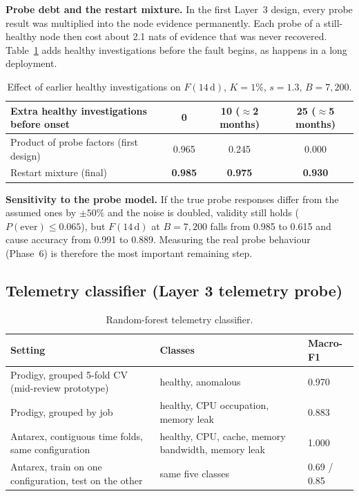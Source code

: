 \documentclass[10pt,a4paper]{article}
\begin{document}
\textbf{Probe debt and the restart mixture.} In the first Layer~3 design, every probe result was multiplied into the node evidence permanently. Each probe of a still-healthy node then cost about 2.1 nats of evidence that was never recovered. Table~\ref{tab:debt} adds healthy investigations before the fault begins, as happens in a long deployment.

\begin{table}[H]
\centering
\caption{Effect of earlier healthy investigations on $F(14\,\mathrm{d})$, $K = 1\%$, $s = 1.3$, $B = 7{,}200$.}
\label{tab:debt}
\small
\begin{tabular}{@{}lccc@{}}
\toprule
Extra healthy investigations before onset & 0 & 10 ($\approx$2 months) & 25 ($\approx$5 months)\\
\midrule
Product of probe factors (first design) & 0.965 & 0.245 & 0.000\\
Restart mixture (final) & \textbf{0.985} & \textbf{0.975} & \textbf{0.930}\\
\bottomrule
\end{tabular}
\end{table}

\textbf{Sensitivity to the probe model.} If the true probe responses differ from the assumed ones by $\pm 50\%$ and the noise is doubled, validity still holds ($P(\text{ever}) \le 0.065$), but $F(14\,\mathrm{d})$ at $B = 7{,}200$ falls from 0.985 to 0.615 and cause accuracy from 0.991 to 0.889. Measuring the real probe behaviour (Phase~6) is therefore the most important remaining step.

\subsection{Telemetry classifier (Layer 3 telemetry probe)}
\begin{table}[H]
\centering
\caption{Random-forest telemetry classifier.}
\label{tab:tel}
\small
\begin{tabularx}{\textwidth}{@{}Xll@{}}
\toprule
Setting & Classes & Macro-F1\\
\midrule
Prodigy, grouped 5-fold CV (mid-review prototype) & healthy, anomalous & 0.970\\
Prodigy, grouped by job & healthy, CPU occupation, memory leak & 0.883\\
Antarex, contiguous time folds, same configuration & healthy, CPU, cache, memory bandwidth, memory leak & 1.000\\
Antarex, train on one configuration, test on the other & same five classes & 0.69 / 0.85\\
\bottomrule
\end{tabularx}
\end{table}
\end{document}
